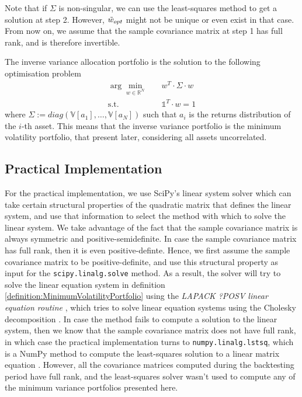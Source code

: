     Note that if $\Sigma$ is non-singular, we can use the least-squares method to get a solution at step 2. However, $\Tilde{w}_{opt}$ might not be unique or even exist in that case. From now on, we assume that the sample covariance matrix at step 1 has full rank, and is therefore invertible.
    
    \begin{remark}\label{remark:IVPEquivalentToMMVP}
        The inverse variance allocation portfolio is the solution to the following optimisation problem
        \begin{align*}
            \arg \min_{w \in \mathbb{R}^N}& \quad w^T \cdot \Sigma \cdot w \\
            \text{s.t.}& \quad \mathds{1}^T \cdot w = 1
        \end{align*}
        where $\Sigma := diag( \mathbb{V}[a_1], \dots, \mathbb{V}[a_N] )$ such that $a_i$ is the returns distribution of the $i$-th asset. This means that the inverse variance portfolio is the minimum volatility portfolio, that present later, considering all assets uncorrelated.
    \end{remark}
    
    
\subsection{Practical Implementation}\label{section:MarkowitzPracticalImplementation}
	
	For the practical implementation, we use SciPy's linear system solver which can take certain structural properties of the quadratic matrix that defines the linear system, and use that information to select the method with which to solve the linear system. We take advantage of the fact that the sample covariance matrix is always symmetric and positive-semidefinite. In case the sample covariance matrix has full rank, then it is even positive-definte. Hence, we first assume the sample covariance matrix to be positive-definite, and use this structural property as input for the \texttt{scipy.linalg.solve} method. As a result, the solver will try to solve the linear equation system in definition \ref{definition:MinimumVolatilityPortfolio} using the \textit{LAPACK ?POSV linear equation routine} \cite{scipylinalgsolve}, which tries to solve linear equation systems using the Cholesky decomposition \cite{lapackposv}. In case the method fails to compute a solution to the linear system, then we know that the sample covariance matrix does not have full rank, in which case the practical implementation turns to \texttt{numpy.linalg.lstsq}, which is a NumPy method to compute the least-squares solution to a linear matrix equation \cite{lstsqnumpy}. However, all the covariance matrices computed during the backtesting period have full rank, and the least-squares solver wasn't used to compute any of the minimum variance portfolios presented here.
	
